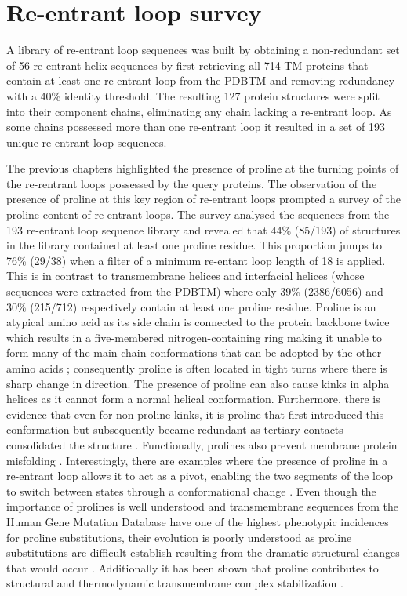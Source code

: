 



\section{Re-entrant loop survey }
A library of re-entrant loop sequences was built by obtaining a non-redundant set of 56 re-entrant helix sequences by first retrieving all 714 TM proteins that contain at least one re-entrant loop from the PDBTM \cite{Kozma2012} and removing redundancy with a 40\% identity threshold. The resulting 127 protein structures were split into their component chains, eliminating any chain lacking a re-entrant loop. As some chains possessed more than one re-entrant loop it resulted in a set of 193 unique re-entrant loop sequences. 

The previous chapters highlighted the presence of proline at the turning points of the re-rentrant loops possessed by the query proteins.  The observation of the presence of proline at this key region of re-entrant loops prompted a survey of the proline content of re-entrant loops. The survey analysed the sequences from the 193 re-entrant loop sequence library and revealed that 44\% (85/193) of structures in the library contained at least one proline residue.  This proportion jumps to 76\% (29/38) when a filter of a minimum re-entant loop length of 18  is applied. This is in contrast to transmembrane helices and interfacial helices (whose sequences were extracted from the PDBTM) where only 39\% (2386/6056) and 30\% (215/712) respectively contain at least one proline residue. Proline is an atypical amino acid as its side chain is connected to the protein backbone twice which results in a five-membered nitrogen-containing ring making it unable to form many of the main chain conformations that can be adopted by the other amino acids \cite{woolfson1990influence};  consequently proline is often located in tight turns where there is sharp change in direction. The presence of proline can also cause kinks in alpha helices as it cannot form a normal helical conformation. Furthermore, there is evidence that even for non-proline kinks, it is proline that first introduced this conformation but subsequently became redundant as tertiary contacts consolidated the structure \cite{yohannan2004evolution}.
Functionally, prolines also prevent membrane protein misfolding \cite{wigley2002protein}.  Interestingly, there are examples where the presence of proline in a re-entrant loop allows it to act as a pivot, enabling the two segments of the loop to switch between states through a conformational change \cite{Kumeta2018,Williamson2015}. Even though the importance of prolines is well understood and transmembrane sequences from the Human Gene Mutation Database \cite{stenson2003human} have one of the highest phenotypic incidences for proline substitutions, their evolution is poorly understood as proline substitutions are difficult establish resulting from the dramatic structural changes that would occur  \cite{partridge2004missense}.  Additionally it has been shown that proline contributes to structural and thermodynamic transmembrane complex stabilization \cite{schmidt2016structural}.  


